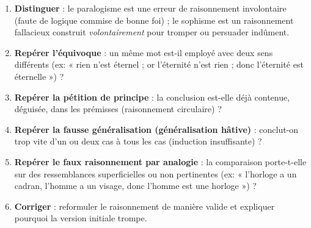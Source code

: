 \documentclass[11pt]{article}
\newcommand{\cle}[1]{{\popxbold\color{popdark}#1}}
\begin{document}
\begin{methode}
\begin{enumerate}
\item \textbf{Distinguer} : le \cle{paralogisme} est une erreur de raisonnement involontaire (faute de logique commise de bonne foi) ; le \cle{sophisme} est un raisonnement fallacieux construit \emph{volontairement} pour tromper ou persuader indûment.
\item \textbf{Repérer l'équivoque} : un même mot est-il employé avec deux sens différents (ex: « rien n'est éternel ; or l'éternité n'est rien ; donc l'éternité est éternelle ») ?
\item \textbf{Repérer la pétition de principe} : la conclusion est-elle déjà contenue, déguisée, dans les prémisses (raisonnement circulaire) ?
\item \textbf{Repérer la fausse généralisation (généralisation hâtive)} : conclut-on trop vite d'un ou deux cas à tous les cas (induction insuffisante) ?
\item \textbf{Repérer le faux raisonnement par analogie} : la comparaison porte-t-elle sur des ressemblances superficielles ou non pertinentes (ex: « l'horloge a un cadran, l'homme a un visage, donc l'homme est une horloge ») ?
\item \textbf{Corriger} : reformuler le raisonnement de manière valide et expliquer pourquoi la version initiale trompe.
\end{enumerate}
\end{methode}
\end{document}
